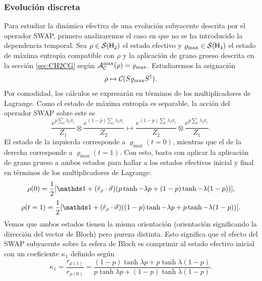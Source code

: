 \subsubsection{Evolución discreta}

Para estudiar la dinámica efectiva de una evolución subyacente descrita por el operador SWAP, primero analizaremos el caso en que no se ha introducido la dependencia temporal. Sea $\rho\in\mathcal{S}({\sf H}_{2})$ el estado efectivo y $\varrho_{\max}\in\mathcal{S}({\sf H}_{4})$ el estado de máxima entropía compatible con $\rho$ y la aplicación de grano grueso descrita en la sección \ref{sec:CH2CG} según $\mathcal{A}_{\mathcal{C}}^{\max}(\rho)=\varrho_{\max}$. Estudiaremos la asignación
\begin{equation}
  \rho\mapsto \mathcal{C}(S \varrho_{\max} S^{\dag}).
\end{equation}
Por comodidad, los cálculos se expresarán en términos de los multiplicadores de Lagrange. Como el estado de máxima entropía es separable, la acción del operador SWAP sobre este es
\begin{equation*}
  \frac{e^{p\sum_{i}\lambda_{i}\sigma_{i}}}{Z_{1}} \otimes \frac{e^{(1-p)\sum_{i}\lambda_{i}\sigma_{i}}}{Z_{2}}\mapsto\frac{e^{(1-p)\sum_{i}\lambda_{i}\sigma_{i}}}{Z_{2}}\otimes\frac{e^{p\sum_{i}\lambda_{i}\sigma_{i}}}{Z_{1}}.
\end{equation*}
El estado de la izquierda corresponde a $\varrho_{\max}(t=0)$, mientras que el de la derecha corresponde a $\varrho_{\max}(t=1)$. Con esto, basta con aplicar la aplicación de grano grueso a ambos estados para hallar a los estados efectivos inicial y final en términos de los multiplicadores de Lagrange:
\begin{equation}
\rho(0)=\frac{1}{2}[\Id+(\hat{r}_{\rho}\cdot\vec{\sigma})(p\tanh{-\lambda p}+(1-p)\tanh{-\lambda (1-p)})],
\end{equation}
\begin{equation}
\rho(t=1)=\frac{1}{2}[\Id+(\hat{r}_{\rho}\cdot\vec{\sigma})((1-p)\tanh{-\lambda p}+p\tanh{-\lambda (1-p)})].
\end{equation}
Vemos que ambos estados tienen la misma orientación (orientación significando la dirección del vector de Bloch) pero pureza distinta. Esto significa que el efecto del \textsc{SWAP} subyacente sobre la esfera de Bloch es comprimir al estado efectivo inicial con un coeficiente $\kappa_{1}$ definido según
\begin{equation}\label{eq:SWAPFactor}
  \kappa_{1}=\frac{r_{\rho(1)}}{r_{\rho(0)}}=\frac{(1-p)\tanh{\lambda p}+p\tanh{\lambda (1-p)}}{
    p\tanh{\lambda p}+(1-p)\tanh{\lambda (1-p)}}.
\end{equation}
